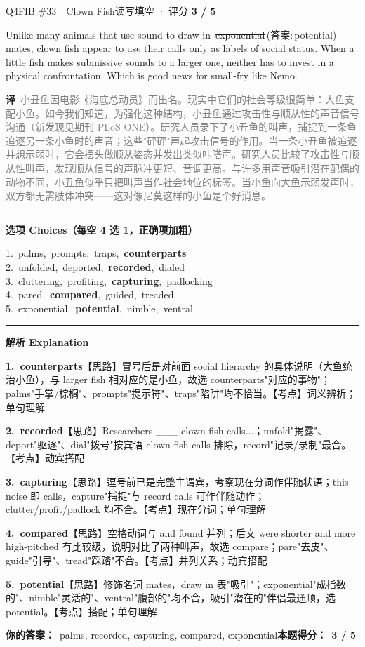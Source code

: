 \documentclass[11pt]{article}
\newcommand{\ptesub}[1]{%
  \par\needspace{2\baselineskip}\smallskip
  {\color{cAccent}\rule[-0.2ex]{3pt}{1.05em}}\hspace{6pt}%
  {\bfseries\color{cHead}#1}\par\nopagebreak\smallskip}
\newcommand{\zh}[1]{{\footnotesize\textcolor{cNote}{\textbf{译}}\ \textcolor{gray}{#1}}}
\newcommand{\rno}[2]{{\color{cWrong}\ding{55}\,\sout{#1}}\,{\footnotesize\color{cFix}(答案:\,#2)}}  %
\begin{document}
\begin{qblock}{Q4\quad FIB \#33\ \ Clown Fish}{读写填空 · 评分 \textcolor{cAccent}{\bfseries 3 / 5}}
\begin{promptbox}
Unlike many animals that use sound to draw in \rno{exponential}{potential} mates, clown fish appear to use their calls only as labels of social status. When a little fish makes submissive sounds to a larger one, neither has to invest in a physical confrontation. Which is good news for small-fry like Nemo.
\end{promptbox}
\zh{小丑鱼因电影《海底总动员》而出名。现实中它们的社会等级很简单：大鱼支配小鱼。如今我们知道，为强化这种结构，小丑鱼通过攻击性与顺从性的声音信号沟通（新发现见期刊 PLoS ONE）。研究人员录下了小丑鱼的叫声，捕捉到一条鱼追逐另一条小鱼时的声音；这些"砰砰"声起攻击信号的作用。当一条小丑鱼被追逐并想示弱时，它会摆头做顺从姿态并发出类似咔嗒声。研究人员比较了攻击性与顺从性叫声，发现顺从信号的声脉冲更短、音调更高。与许多用声音吸引潜在配偶的动物不同，小丑鱼似乎只把叫声当作社会地位的标签。当小鱼向大鱼示弱发声时，双方都无需肢体冲突——这对像尼莫这样的小鱼是个好消息。}
\ptesub{选项 Choices（每空 4 选 1，正确项加粗）}
{\small
1.\ palms,\ prompts,\ traps,\ \textbf{counterparts}\\
2.\ unfolded,\ deported,\ \textbf{recorded},\ dialed\\
3.\ cluttering,\ profiting,\ \textbf{capturing},\ padlocking\\
4.\ pared,\ \textbf{compared},\ guided,\ treaded\\
5.\ exponential,\ \textbf{potential},\ nimble,\ ventral}
\ptesub{解析 Explanation}
\begin{notebox}\footnotesize
\textbf{1.\ counterparts}\quad【思路】冒号后是对前面 social hierarchy 的具体说明（大鱼统治小鱼），与 larger fish 相对应的是小鱼，故选 counterparts"对应的事物"；palms"手掌/棕榈"、prompts"提示符"、traps"陷阱"均不恰当。【考点】词义辨析；单句理解\par\smallskip
\textbf{2.\ recorded}\quad【思路】Researchers \_\_\_ clown fish calls...；unfold"揭露"、deport"驱逐"、dial"拨号"按宾语 clown fish calls 排除，record"记录/录制"最合。【考点】动宾搭配\par\smallskip
\textbf{3.\ capturing}\quad【思路】逗号前已是完整主谓宾，考察现在分词作伴随状语；this noise 即 calls，capture"捕捉"与 record calls 可作伴随动作；clutter/profit/padlock 均不合。【考点】现在分词；单句理解\par\smallskip
\textbf{4.\ compared}\quad【思路】空格动词与 and found 并列；后文 were shorter and more high-pitched 有比较级，说明对比了两种叫声，故选 compare；pare"去皮"、guide"引导"、tread"踩踏"不合。【考点】并列关系；动宾搭配\par\smallskip
\textbf{5.\ potential}\quad【思路】修饰名词 mates，draw in 表"吸引"；exponential"成指数的"、nimble"灵活的"、ventral"腹部的"均不合，吸引"潜在的"伴侣最通顺，选 potential。【考点】搭配；单句理解
\end{notebox}
\smallskip
\textbf{你的答案：}\ {\color{cWrong}palms}, recorded, capturing, compared, {\color{cWrong}exponential}\qquad\textbf{本题得分：}\ {\color{cAccent}\bfseries 3 / 5}
\end{qblock}
\end{document}
